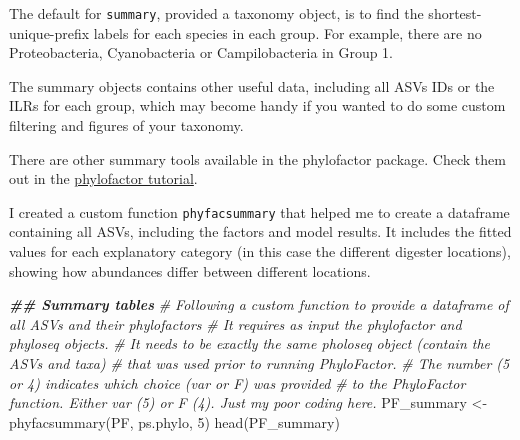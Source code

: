 \documentclass[
]{book}
\newenvironment{Shaded}{\begin{snugshade}}{\end{snugshade}}
\newcommand{\CommentTok}[1]{\textcolor[rgb]{0.56,0.35,0.01}{\textit{#1}}}
\newcommand{\DecValTok}[1]{\textcolor[rgb]{0.00,0.00,0.81}{#1}}
\newcommand{\DocumentationTok}[1]{\textcolor[rgb]{0.56,0.35,0.01}{\textbf{\textit{#1}}}}
\newcommand{\FunctionTok}[1]{\textcolor[rgb]{0.00,0.00,0.00}{#1}}
\newcommand{\NormalTok}[1]{#1}
\newcommand{\OtherTok}[1]{\textcolor[rgb]{0.56,0.35,0.01}{#1}}
\begin{document}
The default for \texttt{summary}, provided a taxonomy object, is to find the shortest-unique-prefix labels for each species in each group. For example, there are no Proteobacteria, Cyanobacteria or Campilobacteria in Group 1.

The summary objects contains other useful data, including all ASVs IDs or the ILRs for each group, which may become handy if you wanted to do some custom filtering and figures of your taxonomy.

There are other summary tools available in the phylofactor package. Check them out in the \href{https://docs.wixstatic.com/ugd/0119a1_099ae20df8424af9a38585dcebc0d45a.pdf}{phylofactor tutorial}.

I created a custom function \texttt{phyfacsummary} that helped me to create a dataframe containing all ASVs, including the factors and model results. It includes the fitted values for each explanatory category (in this case the different digester locations), showing how abundances differ between different locations.

\begin{Shaded}
\begin{Highlighting}[]
\DocumentationTok{\#\# Summary tables}
\CommentTok{\# Following a custom function to provide a dataframe of all ASVs and their phylofactors }
\CommentTok{\# It requires as input the phylofactor and phyloseq objects. }
\CommentTok{\# It needs to be exactly the same pholoseq object (contain the ASVs and taxa) }
\CommentTok{\# that was used prior to running PhyloFactor. }
\CommentTok{\# The number (5 or 4) indicates which \textasciigrave{}choice\textasciigrave{} (\textquotesingle{}var\textquotesingle{} or \textquotesingle{}F\textquotesingle{}) was provided }
\CommentTok{\# to the PhyloFactor function. Either \textquotesingle{}var\textquotesingle{} (5) or \textquotesingle{}F\textquotesingle{} (4). Just my poor coding here.   }
\NormalTok{PF\_summary }\OtherTok{\textless{}{-}} \FunctionTok{phyfacsummary}\NormalTok{(PF, ps.phylo, }\DecValTok{5}\NormalTok{)  }
\FunctionTok{head}\NormalTok{(PF\_summary)}
\end{Highlighting}
\end{Shaded}
\end{document}
